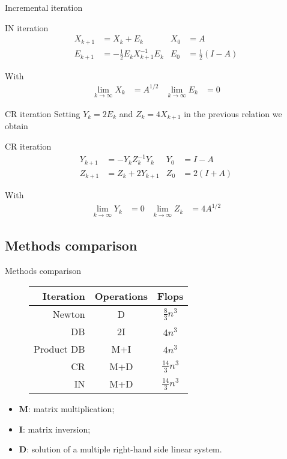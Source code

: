 \documentclass{beamer}
\theoremstyle{plain}
\theoremstyle{definition}
\theoremstyle{remark}
\newcommand{\pa}[1]{\left(#1\right)}
\begin{document}
\begin{frame}{Incremental iteration}
  \begin{block}{IN iteration}
    \begin{align*}
      X_{k+1} &= X_k + E_k & X_0 &= A \\
      E_{k+1} &= -\frac{1}{2} E_k X_{k+1}^{-1} E_k & E_0
                                 &=\frac{1}{2}\pa{I-A}
    \end{align*}
  \end{block}
  With 
  \begin{align*}
    \lim _{k\to \infty} X_k & = A^{1/2} & \lim _{k\to \infty} E_k &=0
  \end{align*}
\end{frame}

\begin{frame}{CR iteration}
  Setting $Y_k = 2E_k$ and $Z_k = 4X_{k+1}$ in the previous relation
  we obtain
  \begin{block}{CR iteration}
    \begin{align*}
      Y_{k+1} &= -Y_kZ_k^{-1}Y_k & Y_0 &= I -A \\
      Z_{k+1} &= Z_k + 2Y_{k+1} & Z_0 &= 2(I+A)
    \end{align*}
  \end{block}
  With 
  \begin{align*}
    \lim _{k\to \infty} Y_k & = 0 & \lim _{k\to \infty} Z_k &=
                                                              4A^{1/2}
  \end{align*}
\end{frame}

\subsection{Methods comparison}

\begin{frame}{Methods comparison}
  \begin{figure}
    \begin{tabular}{ r | c c }
      Iteration & Operations & Flops \\
      \hline
      Newton & D & $\frac{8}{3}n^3$ \\
      DB & 2I & $4n^3$ \\
      Product DB & M+I & $4n^3$ \\
      CR & M+D & $\frac{14}{3}n^3$ \\
      IN & M+D & $\frac{14}{3}n^3$
    \end{tabular}
  \end{figure}
  \begin{itemize}
  \item \textbf{M}: matrix multiplication;
  \item \textbf{I}: matrix inversion;
  \item \textbf{D}: solution of a multiple right-hand side linear system.
  \end{itemize}
\end{frame}
\end{document}
